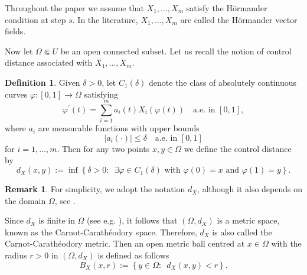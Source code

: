\documentclass[a4paper,12pt,reqno]{amsart}
\numberwithin{equation}{section}
\theoremstyle{plain}
\theoremstyle{definition}
\newtheorem{definition}[theorem]{Definition}
\newtheorem{remark}[theorem]{Remark}
\begin{document}
Throughout the paper we assume that   $X_{1}, \ldots, X_{m}$ satisfy the H\"ormander condition at step $s$. In the literature,  $X_{1}, \ldots, X_{m}$  are called the H\"ormander vector fields.

Now let $\Omega \Subset U$ be an open connected subset.  Let us recall the notion of control distance associated with  $X_{1}, \ldots, X_{m}$.
\begin{definition}
Given $\delta>0$, let $C_{1}(\delta)$ denote the class of absolutely continuous curves $\varphi:[0,1] \rightarrow \Omega$ satisfying
$$
\varphi^{\prime}(t)=\sum_{i=1}^{m} a_{i}(t)X_{i}\left({\varphi(t)}\right)\quad  \text {a.e. in } [0,1],
$$
where $a_{i}$ are measurable functions with upper bounds
$$
\left|a_{i}(\cdot)\right| \leq \delta \quad \text {a.e. in } [0,1] 
$$
for $i=1, \ldots, m$. Then for any two points $x,y\in \Omega$ we define the control distance by
\begin{equation*}
d_{X}(x, y):=\inf \left\{\delta>0:\enspace \exists \varphi \in C_{1}(\delta) \text { with } \varphi(0)=x \text{ and } \varphi(1)=y\right\}.
\end{equation*}
\end{definition} 

\begin{remark}
For simplicity, we adopt the notation $d_{X}$, although it also depends on the domain $\Omega$,  see \cite[Remark 1.30]{bramanti2023hormander}.
\end{remark}
Since $d_{X}$ is finite in $\Omega$ (see e.g. \cite[Theorem 1.45]{bramanti2023hormander}), it follows that $(\Omega, d_{X})$ is a metric space, known as the Carnot-Carath\'eodory space. Therefore,  $d_{X}$ is also called the Carnot-Carath\'eodory metric. Then an open metric ball centred at $x\in\Omega$ with the radius $r>0$ in $(\Omega, d_{X})$ is defined as follows
$$
B_{X}(x, r):=\left\{y \in \Omega: \enspace d_{X}(x, y)<r\right\}.
$$
\end{document}
